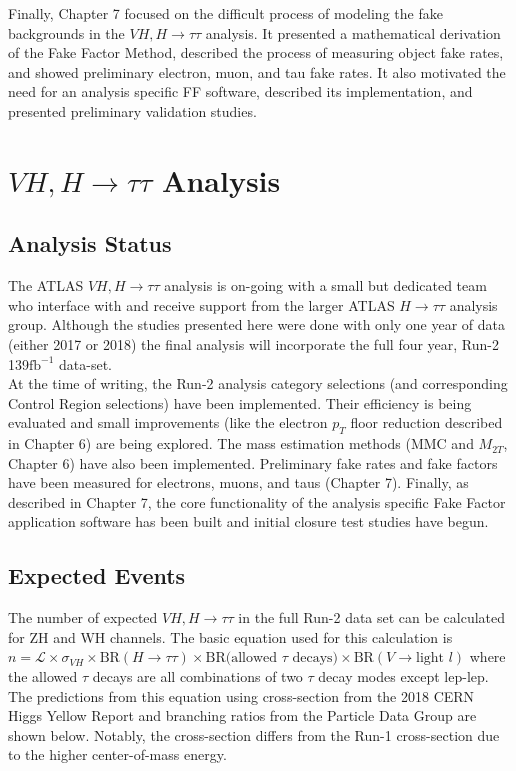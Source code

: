 Finally, Chapter 7 focused on the difficult process of modeling the fake backgrounds in the $VH,H\rightarrow\tau\tau$ analysis. It presented a mathematical derivation of the Fake Factor Method, described the process of measuring object fake rates, and showed preliminary electron, muon, and tau fake rates. It also motivated the need for an analysis specific FF software, described its implementation, and presented preliminary validation studies.

\section{$VH,H\rightarrow\tau\tau$ Analysis}

\subsection{Analysis Status}
The ATLAS $VH,H\rightarrow\tau\tau$ analysis is on-going with a small but dedicated team who interface with and receive support from the larger ATLAS $H\rightarrow\tau\tau$ analysis group. Although the studies presented here were done with only one year of data (either 2017 or 2018) the final analysis will incorporate the full four year, Run-2 139$\text{fb}^{-1}$ data-set.\\

At the time of writing, the Run-2 analysis category selections (and corresponding Control Region selections) have been implemented. Their efficiency is being evaluated and small improvements (like the electron $p_T$ floor reduction described in Chapter 6) are being explored. The mass estimation methods (MMC and $M_{2T}$, Chapter 6) have also been implemented. Preliminary fake rates and fake factors have been measured for electrons, muons, and taus (Chapter 7). Finally, as described in Chapter 7, the core functionality of the analysis specific Fake Factor application software has been built and initial closure test studies have begun.\\

\subsection{Expected Events}
The number of expected $VH,H\rightarrow\tau\tau$ in the full Run-2 data set can be calculated for ZH and WH channels. The basic equation used for this calculation is $n=\mathcal{L}\times\sigma_{VH}\times \text{BR}(H\rightarrow\tau\tau) \times \text{BR(allowed }\tau\text{ decays)}\times \text{BR}(V\rightarrow\text{light }l)$ where the allowed $\tau$ decays are all combinations of two $\tau$ decay modes except lep-lep. The predictions from this equation using cross-section from the 2018 CERN Higgs Yellow Report \cite{yellow_report} and branching ratios from the Particle Data Group \cite{pdg} are shown below. Notably, the cross-section differs from the Run-1 cross-section due to the higher center-of-mass energy.\\

